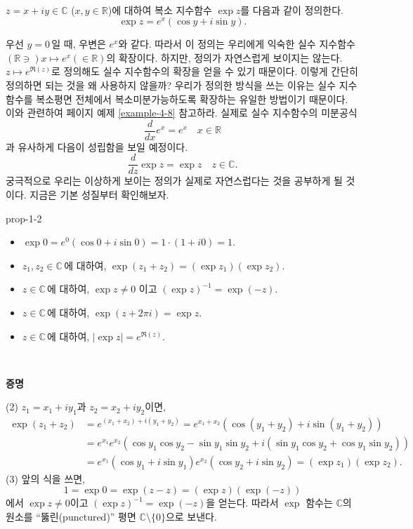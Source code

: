 \

\begin{saltdefinition}[복소 지수함수] {}{} \label{def-1-2}
$z=x+iy\in \mathbb C$ ($x,y\in\mathbb R$)에 대하여
복소 지수함수 $\exp z$를 다음과 같이 정의한다.
$$
\exp z = e^x(\cos y +i\sin y).
$$
\end{saltdefinition}

우선 $y=0$\,일 때, 우변은 $e^x$와 같다. 따라서 이 정의는
우리에게 익숙한 실수 지수함수 $(\mathbb R \ni) x \mapsto e^x (\in \mathbb R)$의 확장이다.
하지만, 정의가 자연스럽게 보이지는 않는다. 
$z\mapsto e^{\Re(z)}$로 정의해도 실수 지수함수의 확장을 얻을 수 있기 때문이다.
이렇게 간단히 정의하면 되는 것을 왜 사용하지 않을까?
우리가 정의한 방식을 쓰는 이유는
실수 지수함수를 복소평면 전체에서 복소미분가능하도록
확장하는 유일한 방법이기 때문이다. 
이와 관련하여 
\pageref{ex-page-4-8}페이지 %
예제 \ref{example-4-8}\를%
참고하라.
실제로 실수 지수함수의 미분공식
$$
\dfrac{d}{dx}e^x  = e^x \quad x\in\mathbb R
$$
과 유사하게 다음이 성립함을 보일 예정이다.
$$
\dfrac{d}{dz} \exp z  = \exp z \quad z\in\mathbb C.
$$
궁극적으로 우리는 이상하게 보이는 정의가 실제로 자연스럽다는 것을 공부하게 될 것이다.
지금은 기본 성질부터 확인해보자.


\begin{saltprop} {prop-1-2} {} %
\begin{itemize}
\item[(1)] $\exp 0 = e^0(\cos 0 + i\sin 0) = 1\cdot(1+i0) = 1$.
\item[(2)] $z_1, z_2\in \mathbb C\,$에 대하여, $\exp(z_1+z_2) = (\exp z_1)(\exp z_2)$.
\item[(3)] $z \in \mathbb C\,$에 대하여, $\exp z \ne 0$ 이고 $(\exp z)^{-1} = \exp (-z)$.
\item[(4)] $z \in \mathbb C\,$에 대하여, $\exp(z+2\pi i) = \exp z$.
\item[(5)] $z \in \mathbb C\,$에 대하여, $|\exp z| = e^{\Re(z)}$.
\end{itemize}
\  %
\end{saltprop}

{\bf 증명}

\noindent
(2)  $z_1 = x_1 + iy_1$과 $z_2 = x_2 + iy_2$이면,
\begin{align*}
\exp(z_1+z_2)
&= e^{(x_1+x_2) + i(y_1+y_2)} = e^{x_1+x_2}
\left( \cos(y_1+y_2) + i\sin(y_1+y_2) \right) \\
&= e^{x_1}e^{x_2} \left( \cos y_1 \cos y_2 - \sin y_1\sin y_2
+ i(\sin y_1\cos y_2 + \cos y_1\sin y_2) \right) \\
&= e^{x_1} (\cos y_1 + i\sin y_1)  e^{x_2} (\cos y_2 + i\sin y_2)  
= (\exp z_1)(\exp z_2).
\end{align*}
(3) 앞의 식을 쓰면,
$$
1  = \exp 0 = \exp (z-z) = (\exp z)(\exp (-z))
$$
에서 $\exp z \ne 0$이고 $(\exp z)^{-1} = \exp(-z)$을 얻는다.
따라서 $\exp$ 함수는 $\mathbb C$의 원소를 
``뚫린(punctured)'' 평면 $\mathbb C\setminus \{0\}$으로 보낸다.

